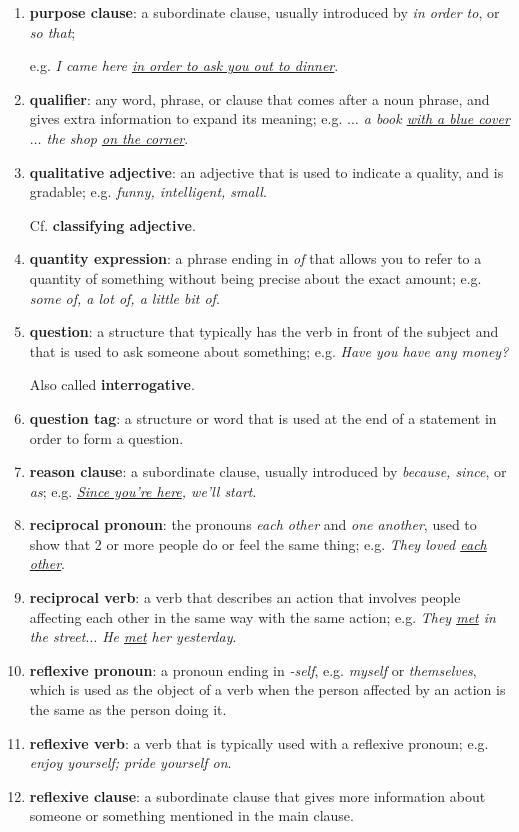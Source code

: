 \documentclass[oneside]{book}
\numberwithin{equation}{section}
\begin{document}
\begin{enumerate}
    Cf. \textbf{common noun}.
    \item \textbf{purpose clause}: a subordinate clause, usually introduced by \textit{in order to}, or \textit{so that};
    
    e.g. \textit{I came here \underline{in order to ask you out to dinner}}.
    \item \textbf{qualifier}: any word, phrase, or clause that comes after a noun phrase, and gives extra information to expand its meaning; e.g. \textit{$\ldots$ a book \underline{with a blue cover} $\ldots$ the shop \underline{on the corner}}.
    \item \textbf{qualitative adjective}: an adjective that is used to indicate a quality, and is gradable; e.g. \textit{funny, intelligent, small}.
    
    Cf. \textbf{classifying adjective}.
    \item \textbf{quantity expression}: a phrase ending in \textit{of} that allows you to refer to a quantity of something without being precise about the exact amount; e.g. \textit{some of, a lot of, a little bit of}.
    \item \textbf{question}: a structure that typically has the verb in front of the subject and that is used to ask someone about something; e.g. \textit{Have you have any money?}
    
    Also called \textbf{interrogative}.
    \item \textbf{question tag}: a structure or word that is used at the end of a statement in order to form a question.
    \item \textbf{reason clause}: a subordinate clause, usually introduced by \textit{because, since}, or \textit{as}; e.g. \textit{\underline{Since you're here}, we'll start}.
    \item \textbf{reciprocal pronoun}: the pronouns \textit{each other} and \textit{one another}, used to show that 2 or more people do or feel the same thing; e.g. \textit{They loved \underline{each other}}.
    \item \textbf{reciprocal verb}: a verb that describes an action that involves people affecting each other in the same way with the same action; e.g. \textit{They \underline{met} in the street$\ldots$ He \underline{met} her yesterday}.
    \item \textbf{reflexive pronoun}: a pronoun ending in \textit{-self}, e.g. \textit{myself} or \textit{themselves}, which is used as the object of a verb when the person affected by an action is the same as the person doing it.
    \item \textbf{reflexive verb}: a verb that is typically used with a reflexive pronoun; e.g. \textit{enjoy yourself; pride yourself on}.
    \item \textbf{reflexive clause}: a subordinate clause that gives more information about someone or something mentioned in the main clause.
    

\end{enumerate}
\end{document}
